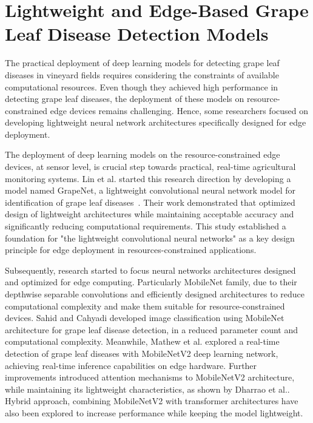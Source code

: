 \section{Lightweight and Edge-Based Grape Leaf Disease Detection Models}
\label{sec:lightweight_edge_grape_leaf_disease}

The practical deployment of deep learning models for detecting grape leaf diseases in vineyard fields requires considering the constraints of available computational resources. Even though they achieved high performance in detecting grape leaf diseases, the deployment of these models on resource-constrained edge devices remains challenging. Hence, some researchers focused on developing lightweight neural network architectures specifically designed for edge deployment.

The deployment of deep learning models on the resource-constrained edge devices, at sensor level, is crucial step towards practical, real-time agricultural monitoring systems. Lin et al. started this research direction by developing a model named GrapeNet, a lightweight convolutional neural network model for identification of grape leaf diseases~\cite{lin2022grapenet}. Their work demonstrated that optimized design of lightweight architectures while maintaining acceptable accuracy and significantly reducing computational requirements. This study established a foundation for "the lightweight convolutional neural networks" as a key design principle for edge deployment in resources-constrained applications. 


Subsequently, research started to focus neural networks architectures designed and optimized for edge computing. Particularly MobileNet family, due to their depthwise separable convolutions and efficiently designed architectures to reduce computational complexity and make them suitable for resource-constrained devices. Sahid and Cahyadi developed image classification using MobileNet architecture for grape leaf disease detection\cite{sahid2025image}, in a reduced parameter count and computational complexity. Meanwhile, Mathew et al. explored a real-time detection of grape leaf diseases with MobileNetV2 deep learning network\cite{mathew2025real}, achieving real-time inference capabilities on edge hardware. Further improvements introduced attention mechanisms to MobileNetV2 architecture, while maintaining its lightweight characteristics, as shown by Dharrao et al.\cite{dharrao2025efficient}. Hybrid approach, combining MobileNetV2 with transformer architectures have also been explored to increase  performance while keeping the model lightweight\cite{tanvir2025pcnn}.


